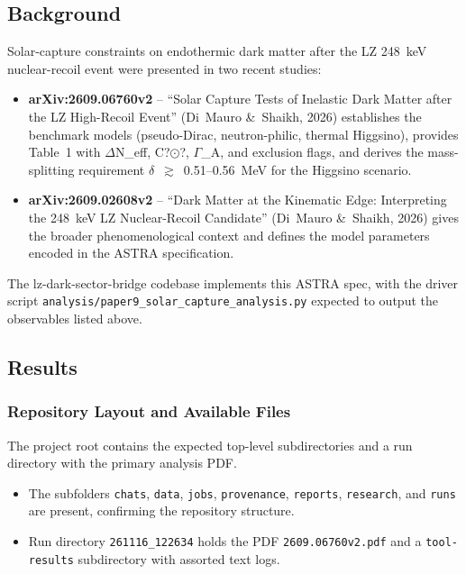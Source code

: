 \documentclass[11pt,a4paper]{article}
\begin{document}
\subsection{Background}
Solar-capture constraints on endothermic dark matter after the LZ 248~keV nuclear-recoil event were presented in two recent studies:

\begin{itemize}
  \item \textbf{arXiv:2609.06760v2} -- ``Solar Capture Tests of Inelastic Dark Matter after the LZ High-Recoil Event'' (Di~Mauro \&~Shaikh, 2026) establishes the benchmark models (pseudo-Dirac, neutron-philic, thermal Higgsino), provides Table~1 with $\Delta$N\_eff, C?$\odot$?, $\Gamma$\_A, and exclusion flags, and derives the mass-splitting requirement $\delta$~$\gtrsim$~0.51--0.56~MeV for the Higgsino scenario.
  \item \textbf{arXiv:2609.02608v2} -- ``Dark Matter at the Kinematic Edge: Interpreting the 248~keV LZ Nuclear-Recoil Candidate'' (Di~Mauro \&~Shaikh, 2026) gives the broader phenomenological context and defines the model parameters encoded in the ASTRA specification.
\end{itemize}
The lz-dark-sector-bridge codebase implements this ASTRA spec, with the driver script \texttt{analysis/\allowbreak{}paper9\_\allowbreak{}solar\_\allowbreak{}capture\_\allowbreak{}analysis.py} expected to output the observables listed above.

\subsection{Results}
\subsubsection{Repository Layout and Available Files}
The project root contains the expected top-level subdirectories and a run directory with the primary analysis PDF.

\begin{itemize}
  \item The subfolders \texttt{chats}, \texttt{data}, \texttt{jobs}, \texttt{provenance}, \texttt{reports}, \texttt{research}, and \texttt{runs} are present, confirming the repository structure.
  \item Run directory \texttt{261116\_\allowbreak{}122634} holds the PDF \texttt{2609.06760v2.pdf} and a \texttt{tool-results} subdirectory with assorted text logs.
\end{itemize}
\end{document}
